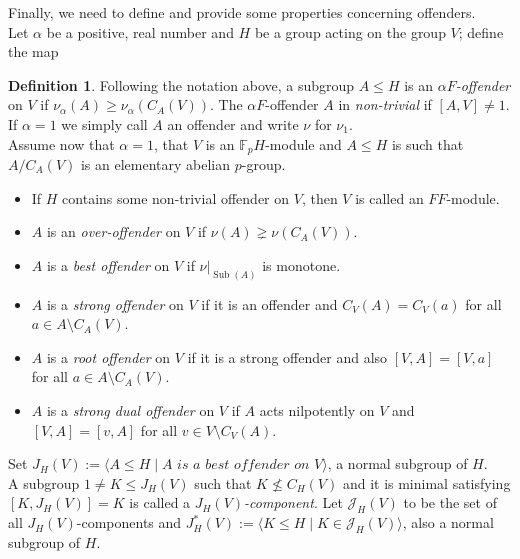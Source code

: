 \documentclass{amsart}
\numberwithin{equation}{section}
\theoremstyle{definition}
\newtheorem{definition}[equation]{Definition}
\theoremstyle{subresult}
\theoremstyle{caseresult}
\newcommand{\bF}{\mathbb{F}}
\newcommand{\bN}{\mathbb{N}}
\newcommand{\J}{\mathcal{J}}
\newcommand{\Sub}{\operatorname{Sub}}
\newcommand{\<}{\langle}
\renewcommand{\>}{\rangle}
\begin{document}
\vspace{0.5cm}
Finally, we need to define and provide some properties concerning offenders.\\
Let $\alpha$ be a positive, real number and $H$ be a group acting on the group $V$; define the map
\begin{center}
\end{center}

\begin{definition}
	\label{def:offenders}
Following the notation above, a subgroup $A \le H$ is an \emph{$\alpha F$-offender} on $V$ if $\nu_\alpha(A) \ge \nu_\alpha(C_A(V))$. The $\alpha F$-offender $A$ in \emph{non-trivial} if $[A,V] \ne 1$. If $\alpha =1$ we simply call $A$ an offender and write $\nu$ for $\nu_1$.\\
Assume now that $\alpha = 1$, that $V$ is an $\bF_p H$-module and $A \le H$ is such that $A/C_A(V)$ is an elementary abelian $p$-group.
\begin{itemize}
	\item If $H$ contains some non-trivial offender on $V$, then $V$ is called an $FF$-module.
	\item $A$ is an \emph{over-offender} on $V$ if $\nu(A) \gneq \nu(C_A(V))$.
	\item $A$ is a \emph{best offender} on $V$ if $\nu |_{ \Sub(A) }$ is monotone.
	\item $A$ is a \emph{strong offender} on $V$ if it is an offender and $C_V(A) = C_V(a)$ for all $a \in A \setminus C_A(V)$.
	\item $A$ is a \emph{root offender} on $V$ if it is a strong offender and also $[V,A]=[V,a]$ for all $a \in A \setminus C_A(V)$.
	\item $A$ is a \emph{strong dual offender} on $V$ if $A$ acts nilpotently on $V$ and $[V,A]=[v,A]$ for all $v \in V \setminus C_V(A)$.
\end{itemize}
Set $J_H(V) := \< A \le H \mid \textit{$A$ is a best offender on $V$} \>$, a normal subgroup of $H$.\\
A subgroup $1 \ne K \le J_H(V)$ such that $K \not \le C_H(V)$ and it is minimal satisfying $[K,J_H(V)]=K$ is called a \emph{$J_H(V)$-component}. Let $\J_H(V)$ to be the set of all $J_H(V)$-components and $J^*_H(V) := \< K \le H \mid K \in \J_H(V) \>$, also a normal subgroup of $H$.
\end{definition}
\end{document}

